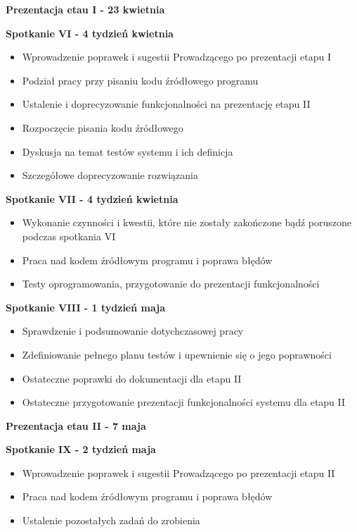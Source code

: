 \par{\textbf{Prezentacja etau I - 23 kwietnia}}

\par{\textbf{Spotkanie VI - 4 tydzień kwietnia}}

\begin{itemize}
\item Wprowadzenie poprawek i sugestii Prowadzącego po prezentacji etapu I
\item Podział pracy przy pisaniu kodu źródłowego programu
\item Ustalenie i doprecyzowanie funkcjonalności na prezentację etapu II
\item Rozpoczęcie pisania kodu źródłowego
\item Dyskusja na temat testów systemu i ich definicja
\item Szczegółowe doprecyzowanie rozwiązania
\end{itemize}

\par{\textbf{Spotkanie VII - 4 tydzień kwietnia}}

\begin{itemize}
\item Wykonanie czynności i kwestii, które nie zostały zakończone bądź poruszone podczas spotkania VI
\item Praca nad kodem źródłowym programu i poprawa błędów
\item Testy oprogramowania, przygotowanie do prezentacji funkcjonalności
\end{itemize}

\par{\textbf{Spotkanie VIII - 1 tydzień maja}}

\begin{itemize}
\item Sprawdzenie i podsumowanie dotychczasowej pracy
\item Zdefiniowanie pełnego planu testów i upewnienie się o jego poprawności
\item Ostateczne poprawki do dokumentacji dla etapu II
\item Ostateczne przygotowanie prezentacji funkcjonalności systemu dla etapu II
\end{itemize}

\par{\textbf{Prezentacja etau II - 7 maja}}

\par{\textbf{Spotkanie IX - 2 tydzień maja}}

\begin{itemize}
\item Wprowadzenie poprawek i sugestii Prowadzącego po prezentacji etapu II
\item Praca nad kodem źródłowym programu i poprawa błędów
\item Ustalenie pozostałych zadań do zrobienia
\end{itemize}

